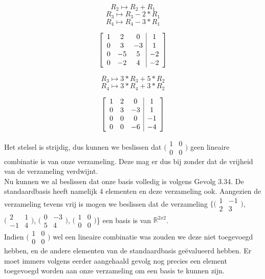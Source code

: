 \documentclass[lineaire_algebra_oplossingen.tex]{subfiles}
\begin{document}
\[R_2 \mapsto R_2 + R_1 \]
\[R_3 \mapsto R_3 - 2*R_1 \]
\[R_4 \mapsto R_4 - 3*R_1 \]

\[
\left[
\begin{array}{c c c | c}
1 & 2 & 0 & 1\\
0 & 3 & -3 & 1\\
0 & -5 & 5 & -2\\
0 & -2 & 4 & -2
\end{array}
\right]
\]

\[R_3 \mapsto 3*R_3 + 5*R_2 \]
\[R_4 \mapsto 3*R_4 + 3*R_2 \]

\[
\left[
\begin{array}{c c c | c}
1 & 2 & 0 & 1\\
0 & 3 & -3 & 1\\
0 & 0 & 0 & -1\\
0 & 0 & -6 & -4
\end{array}
\right]
\]

Het stelsel is strijdig, dus kunnen we beslissen dat $\bigl(
\begin{smallmatrix}
1&0\\ 0&0
\end{smallmatrix}
\bigr)$ geen lineaire combinatie is van onze verzameling. Deze mag er dus bij zonder dat de vrijheid van de verzameling verdwijnt.\\

Nu kunnen we al beslissen dat onze basis volledig is volgens Gevolg 3.34. De standaardbasis heeft namelijk 4 elementen en deze verzameling ook. Aangezien de verzameling tevens vrij is mogen we beslissen dat de verzameling $\{\bigl(
\begin{smallmatrix}
1&-1\\ 2&3
\end{smallmatrix}
\bigr)$,
$\bigl(
\begin{smallmatrix}
2&1\\ -1&4
\end{smallmatrix}
\bigr)$,
$\bigl(
\begin{smallmatrix}
0&-3\\ 5&4
\end{smallmatrix}
\bigr)$,
$\bigl(
\begin{smallmatrix}
1&0\\ 0&0
\end{smallmatrix}
\bigr)$\} een basis is van $\mathbb{R}^{2x2}$.\\

Indien $\bigl(
\begin{smallmatrix}
1&0\\ 0&0
\end{smallmatrix}
\bigr)$ wel een lineaire combinatie was zouden we deze niet toegevoegd hebben, en de andere elementen van de standaardbasis ge\"evalueerd hebben. Er moet immers volgens eerder aangehaald gevolg nog precies een element toegevoegd worden aan onze verzameling om een basis te kunnen zijn.
\end{document}
